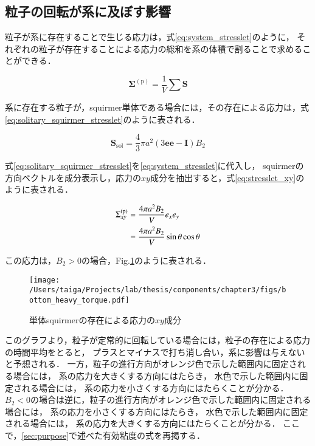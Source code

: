 \subsection{粒子の回転が系に及ぼす影響}
粒子が系に存在することで生じる応力は，式\eqref{eq:system_stresslet}のように，
それぞれの粒子が存在することによる応力の総和を系の体積で割ることで求めることができる\cite{dilute_squirmer}．

    \begin{equation}
        \boldsymbol{\Sigma}^\mathrm{(p)} = \frac{1}{V} \sum \boldsymbol{S}
        \label{eq:system_stresslet}
    \end{equation}

\noindent
系に存在する粒子が，squirmer単体である場合には，その存在による応力は，式\eqref{eq:solitary_squirmer_stresslet}のように表される\cite{dilute_squirmer}．

    \begin{equation}
        \boldsymbol{S}_\mathrm{sol} = \frac{4}{3} \pi a^2 (3 \boldsymbol{ee} - \boldsymbol{I}) B_2
        \label{eq:solitary_squirmer_stresslet}
    \end{equation}

\noindent
式\eqref{eq:solitary_squirmer_stresslet}を\eqref{eq:system_stresslet}に代入し，
squirmerの方向ベクトルを成分表示し，応力の$xy$成分を抽出すると，式\eqref{eq:stresslet_xy}のように表される．

    \begin{align}
        \Sigma^\mathrm{(p)}_{xy} &= \frac{4 \pi a^2 B_2}{V} e_x e_y \notag \\
            &= \frac{4 \pi a^2 B_2}{V} \sin \theta \cos \theta
        \label{eq:stresslet_xy}
    \end{align}

\noindent
この応力は，$B_2 > 0$の場合，Fig.\ref{fig:stresslet_xy}のように表される．

    \begin{figure}[H]
        \centering
        \texttt{[image: /Users/taiga/Projects/lab/thesis/components/chapter3/figs/bottom\_heavy\_torque.pdf]}
        \caption{単体squirmerの存在による応力の$xy$成分}
        \label{fig:stresslet_xy}
    \end{figure}

\noindent
このグラフより，粒子が定常的に回転している場合には，粒子の存在による応力の時間平均をとると，
プラスとマイナスで打ち消し合い，系に影響は与えないと予想される．
一方，粒子の進行方向がオレンジ色で示した範囲内に固定される場合には，
系の応力を大きくする方向にはたらき，
水色で示した範囲内に固定される場合には，
系の応力を小さくする方向にはたらくことが分かる．
$B_2<0$の場合は逆に，粒子の進行方向がオレンジ色で示した範囲内に固定される場合には，
系の応力を小さくする方向にはたらき，
水色で示した範囲内に固定される場合には，
系の応力を大きくする方向にはたらくことが分かる．
ここで，\ref{sec:purpose}で述べた有効粘度の式を再掲する．


